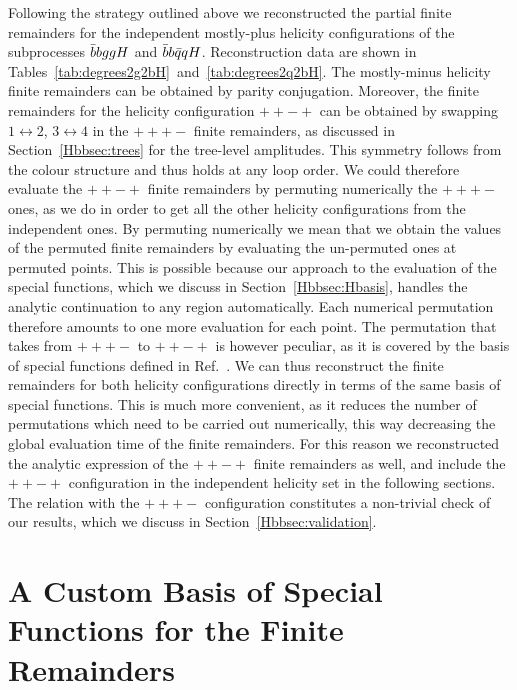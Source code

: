 \documentclass[main.tex]{subfiles}
\begin{document}
Following the strategy outlined above we reconstructed the partial finite remainders for the independent mostly-plus helicity configurations of the subprocesses $\bar{b}bggH$ and $\bar{b}b\bar{q}qH$. Reconstruction data are shown in Tables~\ref{tab:degrees2g2bH}~and~\ref{tab:degrees2q2bH}. The mostly-minus helicity finite remainders can be obtained by parity conjugation. Moreover, the finite remainders for the helicity configuration $++-+$ can be obtained by swapping $1\leftrightarrow2$, $3\leftrightarrow 4$ in the $+++-$ finite remainders, as discussed in Section~\ref{Hbbsec:trees} for the tree-level amplitudes. 
This symmetry follows from the colour structure and thus holds at any loop order. 
We could therefore evaluate the $++-+$ finite remainders by permuting numerically the $+++-$ ones, as we do in order to get all the other helicity configurations from the independent ones. By permuting numerically we mean that we obtain the values of the permuted finite remainders by evaluating the un-permuted ones at permuted points. This is possible because our approach to the evaluation of the special functions, which we discuss in Section~\ref{Hbbsec:Hbasis}, handles the analytic continuation to any region automatically. Each numerical permutation therefore amounts to one more evaluation for each point. The permutation that takes from $+++-$ to $++-+$ is however peculiar, as it is covered by the basis of special functions defined in Ref.~\cite{Badger:2021nhg}. We can thus reconstruct the finite remainders for both helicity configurations directly in terms of the same basis of special functions. This is much more convenient, as it reduces the number of permutations which need to be carried out numerically, this way decreasing the global evaluation time of the finite remainders. For this reason we reconstructed the analytic expression of the $++-+$ finite remainders as well, and include the $++-+$ configuration in the independent helicity set in the following sections. 
The relation with the $+++-$ configuration constitutes a non-trivial check of our results, which we discuss in Section~\ref{Hbbsec:validation}.


\section[A Custom Basis for the Finite Remainders]{A Custom Basis of Special Functions for the Finite Remainders}
\end{document}
